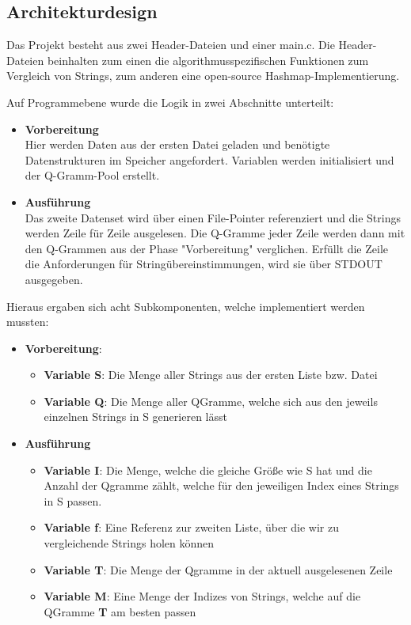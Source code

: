 \clearpage
\subsection{Architekturdesign}

Das Projekt besteht aus zwei Header-Dateien und einer main.c. Die Header-Dateien
beinhalten zum einen die algorithmusspezifischen Funktionen zum Vergleich von
Strings, zum anderen eine open-source Hashmap-Implementierung.

Auf Programmebene wurde die Logik in zwei Abschnitte unterteilt:
\begin{itemize}
    \item \textbf{Vorbereitung} \\
    Hier werden Daten aus der ersten Datei geladen und benötigte Datenstrukturen im Speicher angefordert.
    Variablen werden initialisiert und der Q-Gramm-Pool erstellt.
    \item \textbf{Ausführung} \\
    Das zweite Datenset wird über einen File-Pointer referenziert und die
    Strings werden Zeile für Zeile ausgelesen. Die Q-Gramme jeder Zeile werden dann mit den Q-Grammen aus der Phase "Vorbereitung" verglichen. Erfüllt die Zeile die Anforderungen für Stringübereinstimmungen, wird sie über STDOUT ausgegeben.
\end{itemize}

Hieraus ergaben sich acht Subkomponenten, welche implementiert werden mussten:


\begin{itemize}
    \item \textbf{Vorbereitung}:
    \begin{itemize}
        \item \textbf{Variable S}: Die Menge aller Strings aus der ersten Liste bzw. Datei
        \item \textbf{Variable Q}: Die Menge aller QGramme, welche sich aus den jeweils einzelnen Strings in S generieren lässt
    \end{itemize}

    \item \textbf{Ausführung}
    \begin{itemize}
        \item \textbf{Variable I}: Die Menge, welche die gleiche Größe wie S hat und die
        Anzahl der Qgramme zählt, welche für den jeweiligen Index eines Strings in
        S passen.
        \item \textbf{Variable f}: Eine Referenz zur zweiten Liste, über die wir zu vergleichende Strings holen können
        \item \textbf{Variable T}: Die Menge der Qgramme in der aktuell ausgelesenen Zeile
        \item \textbf{Variable M}: Eine Menge der Indizes von Strings, welche auf die QGramme \textbf{T} am besten passen
    \end{itemize}
\end{itemize}


